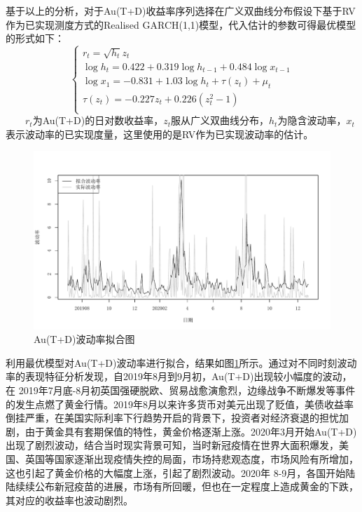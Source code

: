 \documentclass[UTF8,a4paper,12pt]{ctexart}  %
\begin{document}
基于以上的分析，对于Au(T+D)收益率序列选择在广义双曲线分布假设下基于RV作为已实现测度方式的Realised GARCH(1,1)模型，代入估计的参数可得最优模型的形式如下：
\protect\hypertarget{eq:Aurg}{}{\begin{equation}\begin{cases}
r_{t}=\sqrt{h_{t}} z_{t} \\
\log h_{t}=0.422+0.319 \log h_{t-1}+0.484\log x_{t-1} \\
\log x_{1}=-0.831+1.03\log h_{t}+\tau\left(z_{t}\right)+\mu_{t} \\
\tau\left(z_{t}\right)=-0.227 z_{t}+0.226\left(z_{t}^{2}-1\right)\\
\end{cases}\label{eq:Aurg}\end{equation}}
  \(r_t\)为Au(T+D)的日对数收益率，\(z_t\)服从广义双曲线分布，\(h_t\)为隐含波动率，\(x_t\)表示波动率的已实现度量，这里使用的是RV作为已实现波动率的估计。

\begin{figure}[H]

{\centering \includegraphics[width=0.95\linewidth]{03-estimation-lytfinal_files/figure-latex/Auvol-1} 

}

\caption{Au(T+D)波动率拟合图}\label{fig:Auvol}
\end{figure}

利用最优模型对Au(T+D)波动率进行拟合，结果如图\ref{fig:Auvol}所示。通过对不同时刻波动率的表现特征分析发现，自2019年8月到9月初，Au(T+D)出现较小幅度的波动，在
2019年7月底-8月初英国强硬脱欧、贸易战愈演愈烈，边缘战争不断爆发等事件的发生点燃了黄金行情。2019年8月以来许多货币对美元出现了贬值，美债收益率倒挂严重，在美国实际利率下行趋势开启的背景下，投资者对经济衰退的担忧加剧，由于黄金具有套期保值的特性，黄金价格逐渐上涨。2020年3月开始Au(T+D)出现了剧烈波动，结合当时现实背景可知，当时新冠疫情在世界大面积爆发，美国、英国等国家逐渐出现疫情失控的局面，市场持悲观态度，市场风险有所增加，这也引起了黄金价格的大幅度上涨，引起了剧烈波动。2020年
8-9月，各国开始陆陆续续公布新冠疫苗的进展，市场有所回暖，但也在一定程度上造成黄金的下跌，其对应的收益率也波动剧烈。
\end{document}
